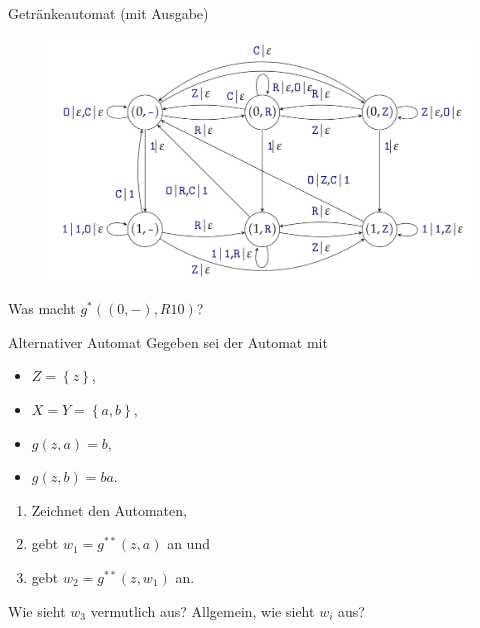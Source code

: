 \begin{frame}{Getränkeautomat (mit Ausgabe)}
    \begin{figure}[htbp]
        \centering
        \includegraphics[width=.80\textwidth,height=.8\textheight,keepaspectratio]{graphics/10/getraenke2.png}
    \end{figure}
    Was macht $g^*\left( \left( 0,- \right), R10 \right)$? \pause{} \pause {} \pause {}
\end{frame}
\begin{frame}{Alternativer Automat}
    Gegeben sei der Automat mit
    \begin{itemize}
        \item $Z = \left\{ z \right\}$,
        \item $X = Y = \left\{ a, b \right\}$,
        \item $g\left( z, a \right) = b$,
        \item $g\left( z, b \right) = ba$.
     \end{itemize}
     \begin{enumerate}
         \item Zeichnet den Automaten,
         \item gebt $w_1 = g^{**}\left( z, a \right)$ an und
         \item gebt $w_2 = g^{**}\left( z, w_1 \right)$ an.
     \end{enumerate}
     Wie sieht $w_3$ vermutlich aus? Allgemein, wie sieht $w_i$ aus?
\end{frame}
